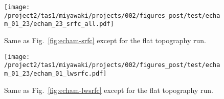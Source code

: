 \documentclass{article}
\begin{document}
\begin{figure}
    \texttt{[image: /project2/tas1/miyawaki/projects/002/figures\_post/test/echam\_01\_23/echam\_23\_srfc\_all.pdf]}
    \caption{Same as Fig.~\ref{fig:echam-srfc} except for the flat topography run.}
    \label{fig:echam-srfc23}
\end{figure}

\begin{figure}
    \texttt{[image: /project2/tas1/miyawaki/projects/002/figures\_post/test/echam\_01\_23/echam\_01\_lwsrfc.pdf]}
    \caption{Same as Fig.~\ref{fig:echam-lwsrfc} except for the flat topography run.}
    \label{fig:echam-lwsrfc23}
\end{figure}



\end{document}
